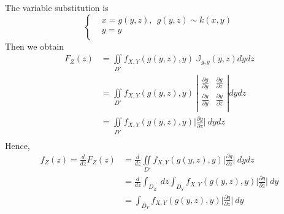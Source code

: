 \documentclass[16pt]{article}
\begin{document}
The variable substitution is
\begin{equation}
\left\{
\begin{aligned}
    & x = g(y,z),~~g(y,z) \sim k(x,y)\\
    & y = y \\
\end{aligned}
\right.
\end{equation}
Then we obtain
\begin{equation}
\begin{aligned}
    F_Z(z) &= \iint \limits_{D'} f_{X,Y}(g(y,z), y)~\mathbb{J}_{g,y} (y,z)dydz \\
    &= \iint \limits_{D'} f_{X,Y}(g(y,z), y)~\left| \begin{array}{cccc} \frac{\partial g}{\partial y} &\frac{\partial g}{\partial z} \\
    \frac{\partial y}{\partial y} &\frac{\partial y}{\partial z} \\
    \end{array} \right| dydz \\
    &= \iint \limits_{D'} f_{X,Y}(g(y,z), y) \bigg|\frac{\partial g}{\partial z}\bigg|~dydz \\
\end{aligned}
\end{equation}
Hence,
\begin{equation}
\begin{aligned}
    f_Z(z) = \frac{d}{dz} F_Z(z) &= \frac{d}{dz}\iint \limits_{D'} f_{X,Y}(g(y,z), y) \bigg|\frac{\partial g}{\partial z}\bigg|~dydz \\
    &= \frac{d}{dz} \int_{D_Z} ~dz \int_{D_Y} f_{X,Y}(g(y,z), y)\bigg|\frac{\partial g}{\partial z}\bigg|~dy \\
    &= \boxed{\int_{D_Y} f_{X,Y}(g(y,z), y)\bigg|\frac{\partial g}{\partial z}\bigg|~dy}
\end{aligned}
\end{equation}
\end{document}

